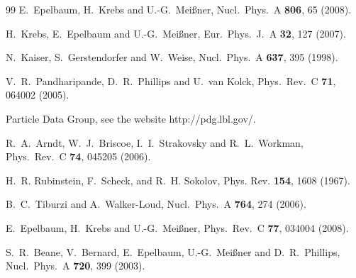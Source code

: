\documentclass[aps,rmp,nofootinbib,twocolumn,floatfix]{revtex4}
\begin{document}
\begin{thebibliography}{99}
  E.~Epelbaum, H.~Krebs and U.-G.~Mei\ss ner,
  Nucl.\ Phys.\  A {\bf 806}, 65 (2008).

  H.~Krebs, E.~Epelbaum and U.-G.~Mei\ss ner,
  Eur.\ Phys.\ J.\  A {\bf 32}, 127 (2007).

  N.~Kaiser, S.~Gerstendorfer and W.~Weise,
  Nucl.\ Phys.\  A {\bf 637}, 395 (1998).

  V.~R.~Pandharipande, D.~R.~Phillips and U.~van Kolck,
  Phys.\ Rev.\  C {\bf 71}, 064002 (2005).

Particle Data Group, see the website http://pdg.lbl.gov/.

  R.~A.~Arndt, W.~J.~Briscoe, I.~I.~Strakovsky and R.~L.~Workman,
  Phys.\ Rev.\  C {\bf 74}, 045205 (2006).

H.~R. Rubinstein, F.~Scheck, and R.~H. Sokolov,
 Phys. Rev. {\bf 154}, 1608 (1967).

 B.~C.~Tiburzi and A.~Walker-Loud,
 Nucl.\ Phys.\  A {\bf 764}, 274 (2006).

  E.~Epelbaum, H.~Krebs and U.-G.~Mei\ss ner,
  Phys.\ Rev.\  C {\bf 77}, 034004 (2008).

  S.~R.~Beane, V.~Bernard, E.~Epelbaum, U.-G.~Mei{\ss}ner and D.~R.~Phillips,
  Nucl.\ Phys.\  A {\bf 720}, 399 (2003).


\end{thebibliography}
\end{document}
